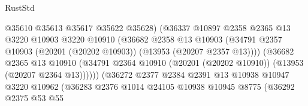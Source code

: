 \begin{lexlean}{RustStd}
\begin{coremodule}
                                          @35610
                                          @35613
                                          @35617
                                          @35622
                                          @35628)
                                        (@36337
                                          @10897
                                          @2358
                                          @2365
                                          @13
                                          @3220
                                          @10903
                                          @3220
                                          @10910
                                          (@36682
                                            @2358
                                            @13
                                            @10903
                                            (@34791
                                              @2357
                                              @10903
                                              (@20201 (@20202 @10903))
                                              (@13953 (@20207 @2357 @13))))
                                          (@36682
                                            @2365
                                            @13
                                            @10910
                                            (@34791
                                              @2364
                                              @10910
                                              (@20201 (@20202 @10910))
                                              (@13953 (@20207 @2364 @13))))))
                                      (@36272
                                        @2377
                                        @2384
                                        @2391
                                        @13
                                        @10938
                                        @10947
                                        @3220
                                        @10962
                                        (@36283
                                          @2376
                                          @1014
                                          @24105
                                          @10938
                                          @10945
                                          @8775
                                          (@36292
                                            @2375
                                            @53
                                            @55

\end{coremodule}
\end{lexlean}
